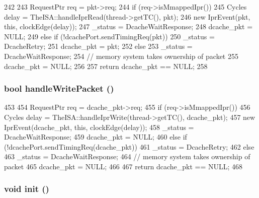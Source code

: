 \begin{DoxyCode}
242 {
243     RequestPtr req = pkt->req;
244     if (req->isMmappedIpr()) {
245         Cycles delay = TheISA::handleIprRead(thread->getTC(), pkt);
246         new IprEvent(pkt, this, clockEdge(delay));
247         _status = DcacheWaitResponse;
248         dcache_pkt = NULL;
249     } else if (!dcachePort.sendTimingReq(pkt)) {
250         _status = DcacheRetry;
251         dcache_pkt = pkt;
252     } else {
253         _status = DcacheWaitResponse;
254         // memory system takes ownership of packet
255         dcache_pkt = NULL;
256     }
257     return dcache_pkt == NULL;
258 }
\end{DoxyCode}
\hypertarget{classTimingSimpleCPU_a8d70b3b102cd0f4949ae31e84ee2eb98}{
\subsubsection[{handleWritePacket}]{\setlength{\rightskip}{0pt plus 5cm}bool handleWritePacket ()}}
\label{classTimingSimpleCPU_a8d70b3b102cd0f4949ae31e84ee2eb98}



\begin{DoxyCode}
453 {
454     RequestPtr req = dcache_pkt->req;
455     if (req->isMmappedIpr()) {
456         Cycles delay = TheISA::handleIprWrite(thread->getTC(), dcache_pkt);
457         new IprEvent(dcache_pkt, this, clockEdge(delay));
458         _status = DcacheWaitResponse;
459         dcache_pkt = NULL;
460     } else if (!dcachePort.sendTimingReq(dcache_pkt)) {
461         _status = DcacheRetry;
462     } else {
463         _status = DcacheWaitResponse;
464         // memory system takes ownership of packet
465         dcache_pkt = NULL;
466     }
467     return dcache_pkt == NULL;
468 }
\end{DoxyCode}
\hypertarget{classTimingSimpleCPU_a02fd73d861ef2e4aabb38c0c9ff82947}{
\subsubsection[{init}]{\setlength{\rightskip}{0pt plus 5cm}void init ()}}
\label{classTimingSimpleCPU_a02fd73d861ef2e4aabb38c0c9ff82947}



